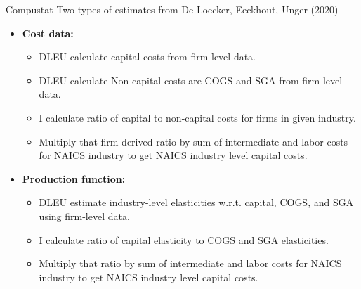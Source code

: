 \documentclass[10pt,xcolor=dvipsnames]{beamer}
\begin{document}
\begin{frame}{Compustat}\label{Afirm}
Two types of estimates from De Loecker, Eeckhout, Unger (2020)

\begin{itemize}
  \item \textbf{Cost data:} 
  \begin{itemize}
    \item DLEU calculate capital costs from firm level data. 
    \item DLEU calculate Non-capital costs are COGS and SGA from firm-level data.
    \item I calculate ratio of capital to non-capital costs for firms in given industry. 
    \item Multiply that firm-derived ratio by sum of intermediate and labor costs for NAICS industry to get NAICS industry level capital costs. 
  \end{itemize} 
  \item \textbf{Production function:} 
  \begin{itemize}
    \item DLEU estimate industry-level elasticities w.r.t. capital, COGS, and SGA using firm-level data. 
    \item I calculate ratio of capital elasticity to COGS and SGA elasticities. 
    \item Multiply that ratio by sum of intermediate and labor costs for NAICS industry to get NAICS industry level capital costs.
  \end{itemize}
\end{itemize}

\vspace{.25in} \hfill \hyperlink{Sfirm}{}
\end{frame}
\end{document}
